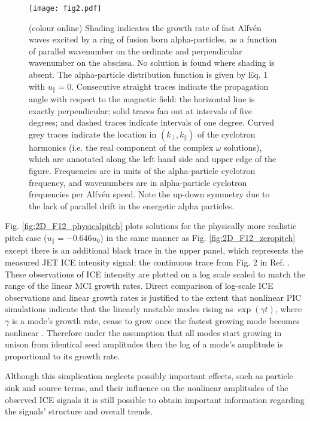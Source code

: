 \documentclass[12pt]{iopart}
\begin{document}
\begin{figure}[ht!]
    \raggedleft
\texttt{[image: fig2.pdf]}
    \caption{(colour online) Shading indicates the growth rate of fast
    Alfv{\'e}n waves excited by a ring of fusion born alpha-particles, as a
    function of parallel wavenumber on the ordinate and perpendicular wavenumber
    on the abscissa. No solution is found where shading is absent. The
    alpha-particle distribution function is given by Eq. 1 with
    $u_{\parallel} = 0$. Consecutive straight traces indicate the propagation
    angle with respect to the magnetic field: the horizontal line is exactly
    perpendicular; solid traces fan out at intervals of five degrees; and dashed
    traces indicate intervals of one degree. Curved grey traces indicate the
    location in $(k_\perp, k_\parallel)$ of the cyclotron harmonics (i.e. the
    real component of the complex $\omega$ solutions), which are annotated along
    the left hand side and upper edge of the figure. Frequencies are in units of
    the alpha-particle cyclotron frequency, and wavenumbers are in
    alpha-particle cyclotron frequencies per Alfv{\'e}n speed. Note the up-down
    symmetry due to the lack of parallel drift in the energetic alpha
    particles.}
    \label{fig:2D_imag_zeropitch}
\end{figure}

Fig. \ref{fig:2D_F12_physicalpitch} plots solutions for the physically more
realistic pitch case ($u_\parallel = -0.646 u_0$) in the same manner as Fig.
\ref{fig:2D_F12_zeropitch} except there is an additional black trace in the
upper panel, which represents the measured JET ICE intensity signal; the continuous
trace from Fig. 2 in Ref. \cite{Cottrell1993}.
These observations of ICE intensity are plotted on a log scale scaled to match
the range of the linear MCI growth rates.
Direct comparison of log-scale
ICE observations and linear growth rates is justified to the extent that
nonlinear PIC simulations indicate that the linearly unstable modes rising
as $\exp(\gamma t)$, where $\gamma$ is a mode's growth rate,
cease to grow once the fastest growing mode becomes
nonlinear \cite{Cook2013}.
Therefore under the assumption that all modes start growing in unison from
identical seed amplitudes then the log of a mode's amplitude is
proportional to its growth rate.

Although this simplication neglects possibly important effects, such as particle sink
and source terms, and their influence on the nonlinear amplitudes of the
observed ICE signals it is still possible to obtain important information
regarding the signals' structure and overall trends.
\end{document}
